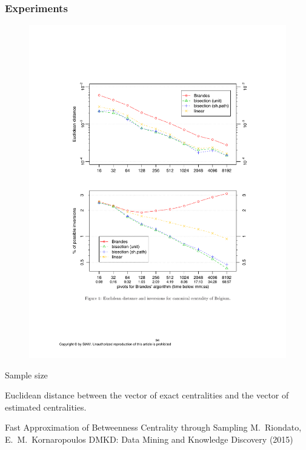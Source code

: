 \begin{frame}
  \frametitle{Experiments}
  \begin{figure}
    \includegraphics[width=\textwidth]{imgs/geisberger.pdf}
  \end{figure}
  \vspace{-30pt}
  \begin{center}
    Sample size
  \end{center}
  Euclidean distance between the vector of exact centralities and the vector of
  estimated centralities.
\end{frame}

\begin{frame}
  \centering
  \vfill
  {\huge Fast Approximation of Betweenness Centrality through Sampling}
  \vfill
  {\Large M.~Riondato, E.~M.~Kornaropoulos}
  \vfill
  {\large DMKD: Data Mining and Knowledge Discovery (2015)}
  \vfill
\end{frame}


